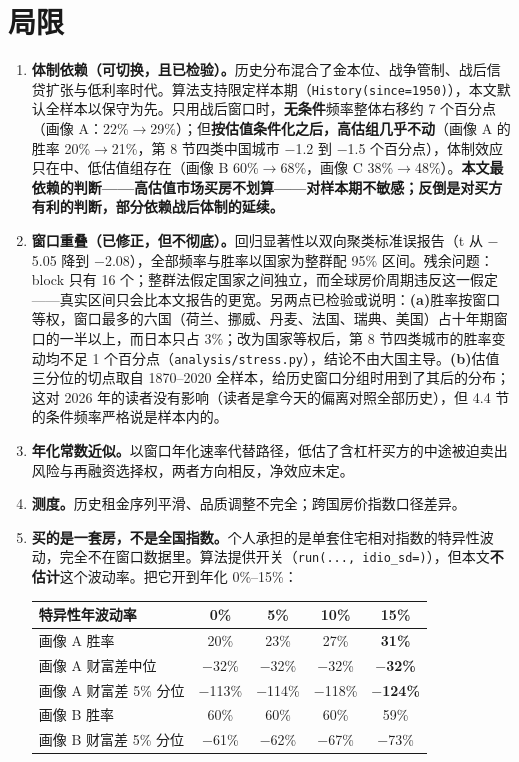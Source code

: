 \documentclass[11pt,a4paper]{ctexart}
\begin{document}
\section{局限}

\begin{enumerate}\itemsep0.2em
\item \textbf{体制依赖（可切换，且已检验）。}历史分布混合了金本位、战争管制、战后信贷扩张与低利率时代。算法支持限定样本期（\texttt{History(since=1950)}），本文默认全样本以保守为先。只用战后窗口时，\textbf{无条件}频率整体右移约 7 个百分点（画像 A：22\%$\to$29\%）；但\textbf{按估值条件化之后，高估组几乎不动}（画像 A 的胜率 20\%$\to$21\%，第 8 节四类中国城市 $-$1.2 到 $-$1.5 个百分点），体制效应只在中、低估值组存在（画像 B 60\%$\to$68\%，画像 C 38\%$\to$48\%）。\textbf{本文最依赖的判断——高估值市场买房不划算——对样本期不敏感；反倒是对买方有利的判断，部分依赖战后体制的延续。}
\item \textbf{窗口重叠（已修正，但不彻底）。}回归显著性以双向聚类标准误报告（t 从 $-$5.05 降到 $-$2.08），全部频率与胜率以国家为整群配 95\% 区间。残余问题：block 只有 16 个；整群法假定国家之间独立，而全球房价周期违反这一假定——真实区间只会比本文报告的更宽。另两点已检验或说明：\textbf{(a)}胜率按窗口等权，窗口最多的六国（荷兰、挪威、丹麦、法国、瑞典、美国）占十年期窗口的一半以上，而日本只占 3\%；改为国家等权后，第 8 节四类城市的胜率变动均不足 1 个百分点（\texttt{analysis/stress.py}），结论不由大国主导。\textbf{(b)}估值三分位的切点取自 1870--2020 全样本，给历史窗口分组时用到了其后的分布；这对 2026 年的读者没有影响（读者是拿今天的偏离对照全部历史），但 4.4 节的条件频率严格说是样本内的。
\item \textbf{年化常数近似。}以窗口年化速率代替路径，低估了含杠杆买方的中途被迫卖出风险与再融资选择权，两者方向相反，净效应未定。
\item \textbf{测度。}历史租金序列平滑、品质调整不完全；跨国房价指数口径差异。
\item \textbf{买的是一套房，不是全国指数。}个人承担的是单套住宅相对指数的特异性波动，完全不在窗口数据里。算法提供开关（\texttt{run(..., idio\_sd=)}），但本文\textbf{不估计}这个波动率。把它开到年化 0\%--15\%：

\begin{table}[H]\centering\small
\begin{tabular}{lcccc}
\toprule
特异性年波动率 & 0\% & 5\% & 10\% & 15\% \\
\midrule
画像 A 胜率 & 20\% & 23\% & 27\% & \textbf{31\%} \\
画像 A 财富差中位 & $-$32\% & $-$32\% & $-$32\% & \textbf{$-$32\%} \\
画像 A 财富差 5\% 分位 & $-$113\% & $-$114\% & $-$118\% & \textbf{$-$124\%} \\
画像 B 胜率 & 60\% & 60\% & 60\% & 59\% \\
画像 B 财富差 5\% 分位 & $-$61\% & $-$62\% & $-$67\% & $-$73\% \\
\bottomrule
\end{tabular}
\end{table}


\end{enumerate}
\end{document}

